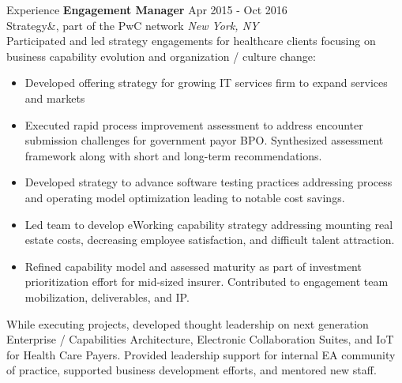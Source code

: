 \documentclass{resume} %
\begin{document}
\begin{rSection}{Experience}
\textbf{Engagement Manager} \hfill Apr 2015 - Oct 2016\\
Strategy\&, part of the PwC network \hfill \textit{New York, NY}\\
Participated and led strategy engagements for healthcare clients focusing on business capability evolution and organization / culture change:
\begin{itemize}
  \itemsep -3pt {} 
  \item Developed offering strategy for growing IT services firm to expand services and markets
  \item Executed rapid process improvement assessment to address encounter submission challenges for government payor BPO. Synthesized assessment framework along with short and long-term recommendations.
  \item Developed strategy to advance software testing practices addressing process and operating model optimization leading to notable cost savings.  
  \item Led team to develop eWorking capability strategy addressing mounting real estate costs, decreasing employee satisfaction, and difficult talent attraction.
  \item Refined capability model and assessed maturity as part of investment prioritization effort for mid-sized insurer. Contributed to engagement team mobilization, deliverables, and IP.
\end{itemize}
While executing projects, developed thought leadership on next generation Enterprise / Capabilities Architecture, Electronic Collaboration Suites, and IoT for Health Care Payers. Provided leadership support for internal EA community of practice, supported business development efforts, and mentored new staff.


\end{rSection}
\end{document}
